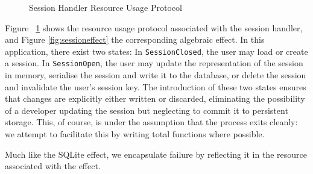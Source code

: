 \begin{figure*}[t]
\begin{center}
\end{center}
\caption{Session Effect}
\label{fig:sessioneffect}
\end{figure*}

\begin{figure}[htpb!]
\centering
{}
\caption{Session Handler Resource Usage Protocol}
\label{fig:sessionstates}
\end{figure}

Figure ~\ref{fig:sessionstates} shows the resource usage protocol associated
with the session handler, and Figure \ref{fig:sessioneffect} the corresponding
algebraic effect. In this application, there exist two states:
In \texttt{SessionClosed}, the user may load or create a
session.
In \texttt{SessionOpen}, the user may update the
representation of the session in memory, serialise the session and write it to
the database, or delete the session and invalidate the user's session key. The
introduction of these two states ensures that changes are explicitly either
written or discarded, eliminating the possibility of a developer updating the
session but neglecting to commit it to persistent storage. This, of course, is
under the assumption that the process exits cleanly: we attempt to facilitate
this by writing total functions where possible.

Much like the SQLite effect, we encapsulate failure by reflecting it in the
resource associated with the effect. 

